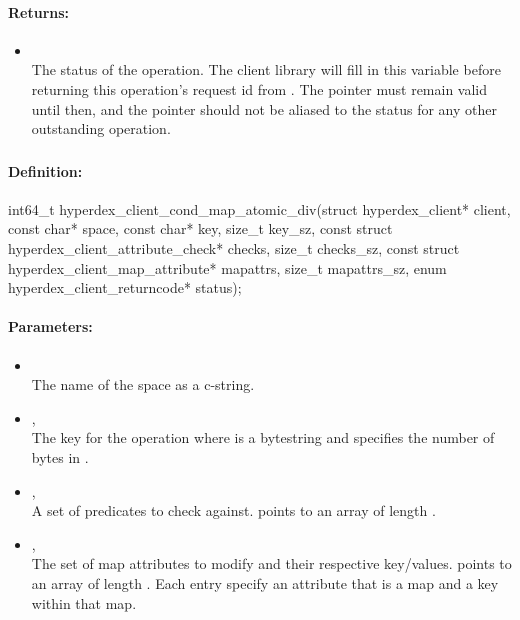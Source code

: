 \paragraph{Returns:}
\begin{itemize}[noitemsep]
\item {}\\
The status of the operation.  The client library will fill in this variable before returning this operation's request id from .  The pointer must remain valid until then, and the pointer should not be aliased to the status for any other outstanding operation.
\end{itemize}

\pagebreak
\subsubsection{}
\label{api:c:cond_map_atomic_div}


\paragraph{Definition:}
\begin{ccode}
int64_t hyperdex_client_cond_map_atomic_div(struct hyperdex_client* client,
        const char* space,
        const char* key, size_t key_sz,
        const struct hyperdex_client_attribute_check* checks, size_t checks_sz,
        const struct hyperdex_client_map_attribute* mapattrs, size_t mapattrs_sz,
        enum hyperdex_client_returncode* status);
\end{ccode}

\paragraph{Parameters:}
\begin{itemize}[noitemsep]
\item {}\\
The name of the space as a c-string.
\item {}, \\
The key for the operation where  is a bytestring and  specifies the number of bytes in .
\item {}, \\
A set of predicates to check against.   points to an array of length .
\item {}, \\
The set of map attributes to modify and their respective key/values.   points to an array of length .  Each entry specify an attribute that is a map and a key within that map.
\end{itemize}

